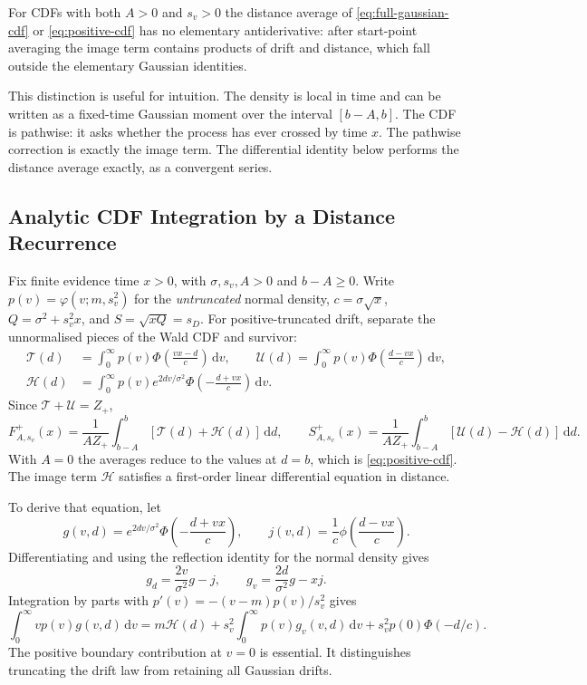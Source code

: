\documentclass[12pt]{article}
\newcommand{\dd}{\,\mathrm{d}}
\newcommand{\PhiN}{\Phi}
\newcommand{\phiN}{\phi}
\begin{document}
For CDFs with both $A>0$ and $s_v>0$ the distance average of
\eqref{eq:full-gaussian-cdf} or \eqref{eq:positive-cdf} has no elementary
antiderivative: after start-point averaging the image term contains products of drift and distance, which fall outside the elementary Gaussian identities.

This distinction is useful for intuition. The density is local in time and can be written as a fixed-time Gaussian moment over the interval $[b-A,b]$. The CDF is pathwise: it asks whether the process has ever crossed by time $x$. The pathwise correction is exactly the image term. The differential identity below performs the distance average exactly, as a convergent series.

\subsection{Analytic CDF Integration by a Distance Recurrence}
\label{sec:joint-cdf-recurrence}
Fix finite evidence time $x>0$, with $\sigma,s_v,A>0$ and $b-A\ge0$. Write $p(v)=\varphi(v;m,s_v^2)$ for the \emph{untruncated} normal density, $c=\sigma\sqrt{x}$, $Q=\sigma^2+s_v^2x$, and $S=\sqrt{xQ}=s_D$. For positive-truncated drift, separate the unnormalised pieces of the Wald CDF and survivor:
\begin{align}
 \mathcal T(d)&=\int_0^\infty p(v)
       \PhiN\!\left(\frac{vx-d}{c}\right)\dd v,\qquad
 \mathcal U(d)=\int_0^\infty p(v)
       \PhiN\!\left(\frac{d-vx}{c}\right)\dd v,\\
 \mathcal H(d)&=\int_0^\infty p(v)e^{2dv/\sigma^2}
       \PhiN\!\left(-\frac{d+vx}{c}\right)\dd v.
\end{align}
Since $\mathcal T+\mathcal U=Z_+$,
\begin{equation}
 F_{A,s_v}^{+}(x)=\frac{1}{AZ_+}\int_{b-A}^b
       [\mathcal T(d)+\mathcal H(d)]\dd d,
 \qquad
 S_{A,s_v}^{+}(x)=\frac{1}{AZ_+}\int_{b-A}^b
       [\mathcal U(d)-\mathcal H(d)]\dd d.
 \label{eq:joint-cdf-target}
\end{equation}
With $A=0$ the averages reduce to the values at $d=b$, which is
\eqref{eq:positive-cdf}. The image term $\mathcal H$ satisfies a first-order
linear differential equation in distance.

To derive that equation, let
\[
 g(v,d)=e^{2dv/\sigma^2}\PhiN\!\left(-\frac{d+vx}{c}\right),
 \qquad j(v,d)=\frac{1}{c}\phiN\!\left(\frac{d-vx}{c}\right).
\]
Differentiating and using the reflection identity for the normal density gives
\begin{equation}
 g_d=\frac{2v}{\sigma^2}g-j,
 \qquad g_v=\frac{2d}{\sigma^2}g-xj.
 \label{eq:joint-reflection-derivatives}
\end{equation}
Integration by parts with $p'(v)=-(v-m)p(v)/s_v^2$ gives
\begin{equation}
 \int_0^\infty vp(v)g(v,d)\dd v
 =m\mathcal H(d)+s_v^2\int_0^\infty p(v)g_v(v,d)\dd v
       +s_v^2p(0)\PhiN(-d/c).
\end{equation}
The positive boundary contribution at $v=0$ is essential. It distinguishes truncating the drift law from retaining all Gaussian drifts.
\end{document}
